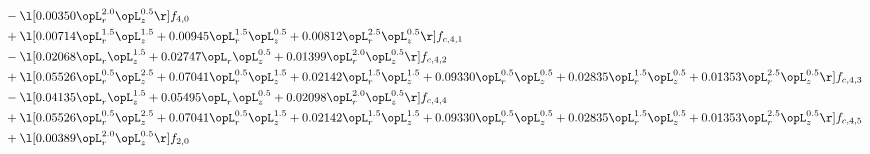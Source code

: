 \begin{alignat}{2}
& - \l[  0.00350 \opL_r^{2.0} \opL_z^{0.5}  \r] f_{4,0} \nonumber \\ 
& + \l[  0.00714 \opL_r^{1.5} \opL_z^{1.5} +  0.00945 \opL_r^{1.5} \opL_z^{0.5} +  0.00812 \opL_r^{2.5} \opL_z^{0.5}  \r] f_{c,4,1} \nonumber \\ 
& - \l[  0.02068 \opL_r \opL_z^{1.5} +  0.02747 \opL_r \opL_z^{0.5} +  0.01399 \opL_r^{2.0} \opL_z^{0.5}  \r] f_{c,4,2} \nonumber \\ 
& + \l[  0.05526 \opL_r^{0.5} \opL_z^{2.5} +  0.07041 \opL_r^{0.5} \opL_z^{1.5} +  0.02142 \opL_r^{1.5} \opL_z^{1.5} +  0.09330 \opL_r^{0.5} \opL_z^{0.5} +  0.02835 \opL_r^{1.5} \opL_z^{0.5} +  0.01353 \opL_r^{2.5} \opL_z^{0.5}  \r] f_{c,4,3} \nonumber \\ 
& - \l[  0.04135 \opL_r \opL_z^{1.5} +  0.05495 \opL_r \opL_z^{0.5} +  0.02098 \opL_r^{2.0} \opL_z^{0.5}  \r] f_{c,4,4} \nonumber \\ 
& + \l[  0.05526 \opL_r^{0.5} \opL_z^{2.5} +  0.07041 \opL_r^{0.5} \opL_z^{1.5} +  0.02142 \opL_r^{1.5} \opL_z^{1.5} +  0.09330 \opL_r^{0.5} \opL_z^{0.5} +  0.02835 \opL_r^{1.5} \opL_z^{0.5} +  0.01353 \opL_r^{2.5} \opL_z^{0.5}  \r] f_{c,4,5} \nonumber \\ 
& + \l[  0.00389 \opL_r^{2.0} \opL_z^{0.5}  \r] f_{2,0} \nonumber \\ 
\end{alignat} 


